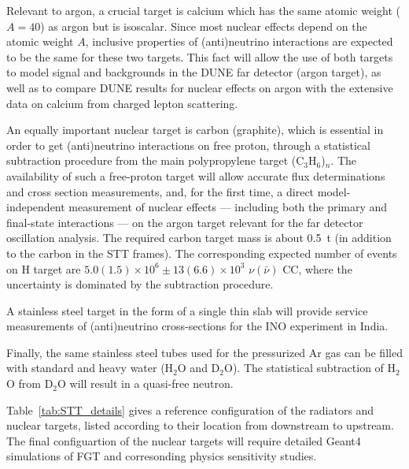 
Relevant to argon, a crucial target is calcium which has the same
atomic weight ($A=40$) as argon but is isoscalar.  Since most nuclear
effects depend on the atomic weight $A$, inclusive properties of
(anti)neutrino interactions are expected to be the same for these two
targets.  This fact will allow the use of both targets to model
signal and backgrounds in the DUNE far detector (argon target), as
well as to compare DUNE results for nuclear effects on argon with the
extensive data on calcium from charged lepton scattering.


An equally important nuclear target is carbon (graphite), which is
essential in order to get (anti)neutrino interactions on free proton,
through a statistical subtraction procedure from the main
polypropylene target (C$_3$H$_6$)$_n$.  The availability of such a
free-proton target will allow accurate flux determinations and cross
section measurements, and, for the first time, a direct
model-independent measurement of nuclear effects --- including both
the primary and final-state interactions --- on the argon target
relevant for the far detector oscillation analysis. The required
carbon target mass is about 0.5~t (in addition to the carbon in the
STT frames). The corresponding expected number of events on H target
are $5.0 (1.5) \times 10^6 \pm 13(6.6) \times 10^3$ $\nu(\bar \nu)$
CC, where the uncertainty is dominated by the subtraction procedure.

A stainless steel target in the form of a single thin slab will
provide service measurements of (anti)neutrino cross-sections for the
INO experiment in India.

Finally, the same stainless steel tubes used for the pressurized Ar gas can
be filled with standard and heavy water (H$_2$O and D$_2$O). The
statistical subtraction of H$_2$O from D$_2$O will result in a
quasi-free neutron.

Table~\ref{tab:STT_details} gives a reference configuration of the
radiators and nuclear targets, listed according to their location from
downstream to upstream.  The final configuartion of the nuclear
targets will require detailed Geant4 simulations of FGT and
corresonding physics sensitivity studies.


